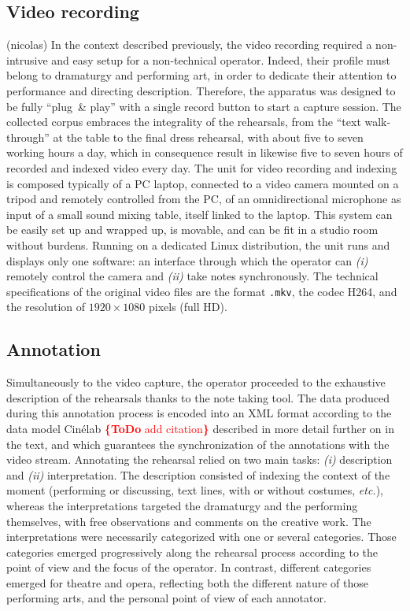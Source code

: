\documentclass[conference]{IEEEtran}
\newcommand{\todo}[1]{\noindent\textcolor{red}{{\bf \{ToDo} #1{\bf \}}}}
\begin{document}
\subsection{Video recording}  (nicolas)
In the context described previously, the video recording required a non-intrusive and easy setup for a non-technical operator. Indeed, their profile must belong to dramaturgy and performing art, in order to dedicate their attention to performance and directing description. Therefore, the apparatus was designed to be fully ``plug\ \& play'' with a single record button to start a capture session.
The collected corpus embraces the integrality of the rehearsals, from the ``text walk-through'' at the table to the final dress rehearsal, with about five to seven working hours a day, which in consequence result in likewise five to seven hours of recorded and indexed video every day.
The unit for video recording and indexing is composed typically of a PC laptop, connected to a video camera mounted on a tripod and remotely controlled from the PC, of an omnidirectional microphone as input of a small sound mixing table, itself linked to the laptop. This system can be easily set up and wrapped up, is movable, and can be fit in a studio room without burdens. Running on a dedicated Linux distribution, the unit runs and displays only one software: an interface through which the operator can \emph{(i)} remotely control the camera and \emph{(ii)} take notes synchronously. 
The technical specifications of the original video files are the format \texttt{.mkv}, the codec H264, and the resolution of $1920 \times 1080$ pixels (full HD).

\subsection{Annotation}
Simultaneously to the video capture, the operator proceeded to the exhaustive description of the rehearsals thanks to the note taking tool. The data produced during this annotation process is encoded into an XML format according to the data model Cinélab \todo{add citation} described in more detail further on in the text, and which guarantees the synchronization of the annotations with the video stream. 
Annotating the rehearsal relied on two main tasks: \emph{(i)} description and \emph{(ii)} interpretation. The description consisted of indexing the context of the moment (performing or discussing, text lines, with or without costumes, \emph{etc.}), whereas the interpretations targeted the dramaturgy and the performing themselves, with free observations and comments on the creative work. The interpretations were necessarily categorized with one or several categories. Those categories emerged progressively along the rehearsal process according to the point of view and the focus of the operator. 
In contrast, different categories emerged for theatre and opera, reflecting both the different nature of those performing arts, and the personal point of view of each annotator.
\end{document}
